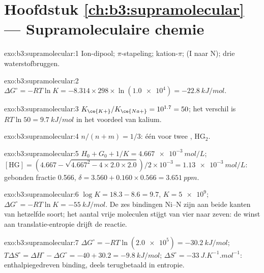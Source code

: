 \section*{Hoofdstuk \ref{ch:b3:supramolecular} --- Supramoleculaire chemie}

\begin{solution}{exo:b3:supramolecular:1}
Ion-dipool; $\pi$-stapeling; kation-$\pi$;  (I naar N); drie waterstofbruggen.
\end{solution}

\begin{solution}{exo:b3:supramolecular:2}
$\Delta G^\circ = -RT\ln K = -8.314 \times 298 \times \ln(\num{1.0e4}) = \qty{-22.8}{kJ/mol}$.
\end{solution}

\begin{solution}{exo:b3:supramolecular:3}
$K_{\ce{K+}}/K_{\ce{Na+}} = 10^{1.7} = 50$; het verschil is $RT\ln 50 = \qty{9.7}{kJ/mol}$ in het voordeel van kalium.
\end{solution}

\begin{solution}{exo:b3:supramolecular:4}
$n/(n + m) = 1/3$: één  voor twee , $\mathrm{HG_2}$.
\end{solution}

\begin{solution}{exo:b3:supramolecular:5}
$H_0 + G_0 + 1/K = \qty{4.667e-3}{mol/L}$; $[\mathrm{HG}] = (4.667 - \sqrt{4.667^2 - 4 \times 2.0 \times 2.0})/2 \times 10^{-3} = \qty{1.13e-3}{mol/L}$: gebonden
fractie 0.566, $\delta = 3.560 + 0.160 \times 0.566 = \qty{3.651}{ppm}$.
\end{solution}

\begin{solution}{exo:b3:supramolecular:6}
$\log K = 18.3 - 8.6 = 9.7$, $K = \num{5e9}$; $\Delta G^\circ = -RT\ln K = \qty{-55}{kJ/mol}$. De zes bindingen Ni--N zijn aan
beide kanten van hetzelfde soort; het aantal vrije moleculen stijgt van
vier naar zeven: de winst aan translatie-entropie drijft de reactie.
\end{solution}

\begin{solution}{exo:b3:supramolecular:7}
$\Delta G^\circ = -RT\ln(\num{2.0e5}) = \qty{-30.2}{kJ/mol}$; $T\Delta S^\circ = \Delta H^\circ - \Delta G^\circ = -40 + 30.2 = \qty{-9.8}{kJ/mol}$;
$\Delta S^\circ = \qty{-33}{J.K^{-1}.mol^{-1}}$: enthalpiegedreven binding, deels terugbetaald in entropie.
\end{solution}

